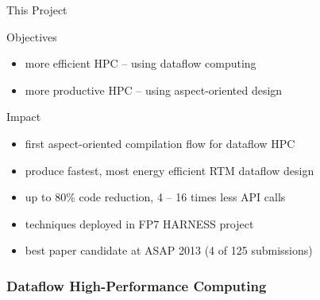 \begin{frame}{This Project}
  \begin{beamerboxesrounded}{Objectives}
    \begin{itemize}
    \item more efficient HPC -- using dataflow computing
    \item more productive HPC -- using aspect-oriented design
    \end{itemize}
  \end{beamerboxesrounded}
  \vspace{0.3cm}
  \begin{beamerboxesrounded}{Impact}
    \begin{itemize}
    \item first aspect-oriented compilation flow for dataflow HPC
    \item produce fastest, most energy efficient RTM dataflow design
    \item up to 80\% code reduction, 4 -- 16 times less API calls
    \item techniques deployed in FP7 HARNESS project
    \item best paper candidate at ASAP 2013 (4 of 125 submissions)
    \end{itemize}
  \end{beamerboxesrounded}
\end{frame}


\begin{frame}
  \frametitle{Dataflow High-Performance Computing}
  \begin{figure}[!ht]
    \centering
    \def\svgwidth{0.9\linewidth}
    
  \end{figure}
\end{frame}

